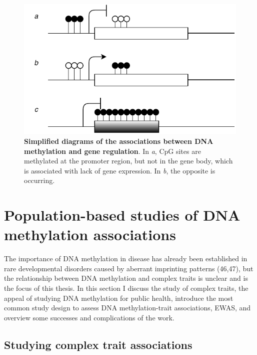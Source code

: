 \documentclass[11pt,oneside]{bristolthesis}
\begin{document}
\begin{figure}

{\centering \includegraphics[width=1\linewidth]{figure/01-introduction/dnam-gene-expression} 

}

\caption[Simplified diagrams of the associations between DNA methylation and gene regulation]{\textbf{Simplified diagrams of the associations between DNA methylation and gene regulation}. In \emph{a}, CpG sites are methylated at the promoter region, but not in the gene body, which is associated with lack of gene expression. In \emph{b}, the opposite is occurring.}\label{fig:dnam-functions}
\end{figure}
\hypertarget{dnam-phs}{%
\section{Population-based studies of DNA methylation associations}\label{dnam-phs}}

The importance of DNA methylation in disease has already been established in rare developmental disorders caused by aberrant imprinting patterns (46,47), but the relationship between DNA methylation and complex traits is unclear and is the focus of this thesis. In this section I discuss the study of complex traits, the appeal of studying DNA methylation for public health, introduce the most common study design to assess DNA methylation-trait associations, EWAS, and overview some successes and complications of the work.

\hypertarget{studying-complex-trait-associations}{%
\subsection{Studying complex trait associations}\label{studying-complex-trait-associations}}
\end{document}
